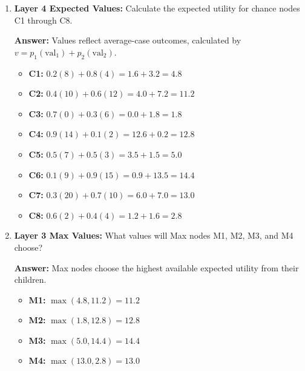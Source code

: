 \documentclass[11pt, letterpaper]{article}
\begin{document}
\begin{enumerate}[resume]
    \item \textbf{Layer 4 Expected Values:} Calculate the expected utility for chance nodes C1 through C8.\\
    \begin{tcolorbox}[colback=gray!10, colframe=gray!50, title=Solution]
    \textbf{Answer:} Values reflect average-case outcomes, calculated by $v = p_1(\text{val}_1) + p_2(\text{val}_2)$.
    \begin{itemize}
        \item \textbf{C1:} $0.2(8) + 0.8(4) = 1.6 + 3.2 = \mathbf{4.8}$
        \item \textbf{C2:} $0.4(10) + 0.6(12) = 4.0 + 7.2 = \mathbf{11.2}$
        \item \textbf{C3:} $0.7(0) + 0.3(6) = 0.0 + 1.8 = \mathbf{1.8}$
        \item \textbf{C4:} $0.9(14) + 0.1(2) = 12.6 + 0.2 = \mathbf{12.8}$
        \item \textbf{C5:} $0.5(7) + 0.5(3) = 3.5 + 1.5 = \mathbf{5.0}$
        \item \textbf{C6:} $0.1(9) + 0.9(15) = 0.9 + 13.5 = \mathbf{14.4}$
        \item \textbf{C7:} $0.3(20) + 0.7(10) = 6.0 + 7.0 = \mathbf{13.0}$
        \item \textbf{C8:} $0.6(2) + 0.4(4) = 1.2 + 1.6 = \mathbf{2.8}$
    \end{itemize}
    \end{tcolorbox}

    \item \textbf{Layer 3 Max Values:} What values will Max nodes M1, M2, M3, and M4 choose?\\
    \begin{tcolorbox}[colback=gray!10, colframe=gray!50, title=Solution]
    \textbf{Answer:} Max nodes choose the highest available expected utility from their children.
    \begin{itemize}
        \item \textbf{M1:} $\max(4.8, 11.2) = \mathbf{11.2}$
        \item \textbf{M2:} $\max(1.8, 12.8) = \mathbf{12.8}$
        \item \textbf{M3:} $\max(5.0, 14.4) = \mathbf{14.4}$
        \item \textbf{M4:} $\max(13.0, 2.8) = \mathbf{13.0}$
    \end{itemize}
    \end{tcolorbox}


\end{enumerate}
\end{document}
